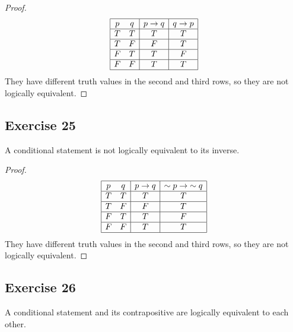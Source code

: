 \documentclass[14pt]{extarticle}
\begin{document}
\begin{proof}
    $$
        \begin{array}{|cc|c|c|}
            \hline
            p & q & p \to q & q \to p \\
            \hline
            T & T & T       & T       \\
            \hline
            T & F & F       & T       \\
            \hline
            F & T & T       & F       \\
            \hline
            F & F & T       & T       \\
            \hline
        \end{array}
    $$
    They have different truth values in the second and third rows, so they are not logically equivalent.
\end{proof}

\subsection{Exercise 25} A conditional statement is not logically equivalent to its inverse.

\begin{proof}
    $$
        \begin{array}{|cc|c|c|}
            \hline
            p & q & p \to q & {\sim p} \to {\sim q} \\
            \hline
            T & T & T       & T                     \\
            \hline
            T & F & F       & T                     \\
            \hline
            F & T & T       & F                     \\
            \hline
            F & F & T       & T                     \\
            \hline
        \end{array}
    $$
    They have different truth values in the second and third rows, so they are not logically equivalent.
\end{proof}

\subsection{Exercise 26}
A conditional statement and its contrapositive are logically equivalent to each other.
\end{document}
